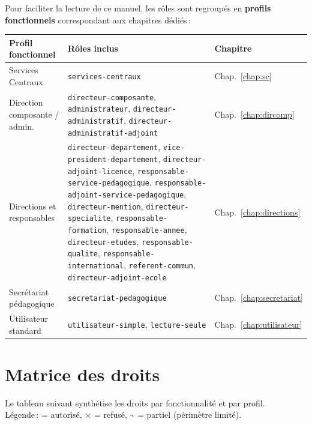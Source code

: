 Pour faciliter la lecture de ce manuel, les r\^oles sont regroup\'es en \textbf{profils fonctionnels} correspondant aux chapitres d\'edi\'es\,:

\medskip
\begin{tabularx}{\textwidth}{L{3.5cm}XC{2.5cm}}
  \toprule
  \textbf{Profil fonctionnel} & \textbf{R\^oles inclus} & \textbf{Chapitre} \\
  \midrule
  Services Centraux
    & \texttt{services-centraux}
    & Chap.~\ref{chap:sc} \\
  Direction composante / admin.
    & \texttt{directeur-composante}, \texttt{administrateur}, \texttt{directeur-administratif}, \texttt{directeur-administratif-adjoint}
    & Chap.~\ref{chap:dircomp} \\
  Directions et responsables
    & \texttt{directeur-departement}, \texttt{vice-president-departement}, \texttt{directeur-adjoint-licence}, \texttt{responsable-service-pedagogique}, \texttt{responsable-adjoint-service-pedagogique}, \texttt{directeur-mention}, \texttt{directeur-specialite}, \texttt{responsable-formation}, \texttt{responsable-annee}, \texttt{directeur-etudes}, \texttt{responsable-qualite}, \texttt{responsable-international}, \texttt{referent-commun}, \texttt{directeur-adjoint-ecole}
    & Chap.~\ref{chap:directions} \\
  Secr\'etariat p\'edagogique
    & \texttt{secretariat-pedagogique}
    & Chap.~\ref{chap:secretariat} \\
  Utilisateur standard
    & \texttt{utilisateur-simple}, \texttt{lecture-seule}
    & Chap.~\ref{chap:utilisateur} \\
  \bottomrule
\end{tabularx}

\section{Matrice des droits}

Le tableau suivant synth\'etise les droits par fonctionnalit\'e et par profil. \\
L\'egende\,: \textbf{\textcolor{cgpgreen}{\checkmark}} = autoris\'e, \textbf{\textcolor{cgpred}{$\times$}} = refus\'e, \textbf{\textcolor{cgporange}{\textasciitilde}} = partiel (p\'erim\`etre limit\'e).

